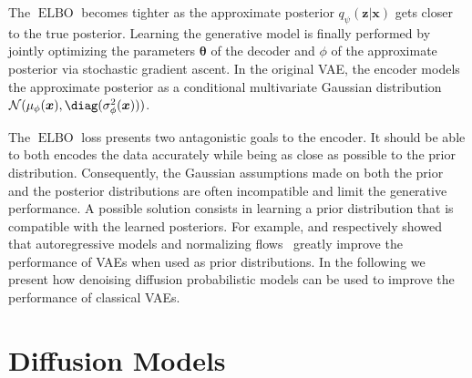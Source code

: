 The $\operatorname{ELBO}$ becomes tighter as the approximate posterior $q_\psi(\mathbf{z}|\mathbf{x})$ gets closer to the true posterior.
Learning the generative model is finally performed by jointly optimizing the parameters $\mathbf{\theta}$ of the decoder and $\phi$ of the approximate posterior via stochastic gradient ascent.
In the original VAE, the encoder models the approximate posterior as a conditional multivariate Gaussian distribution $\mathcal{N}(\mu_\phi(\mathbf{x}), \diag(\sigma_\phi^2(\mathbf{x})))$.

The $\operatorname{ELBO}$ loss presents two antagonistic goals to the encoder.
It should be able to both encodes the data accurately while being as close as possible to the prior distribution. Consequently, the Gaussian assumptions made on both the prior and the posterior distributions are often incompatible and limit the generative performance.
A possible solution consists in learning a prior distribution that is compatible with the learned posteriors. For example, \citet{PriorAutoreg2019} and \citet{chen_variational_2017} respectively showed that autoregressive models and normalizing flows~\citep[NFs]{rezende2015variational} greatly improve the performance of VAEs when used as prior distributions.
In the following we present how denoising diffusion probabilistic models can be used to improve the performance of classical VAEs.

\section{Diffusion Models}

